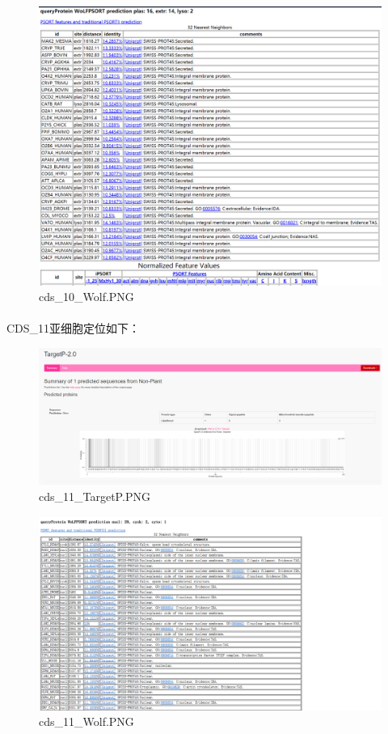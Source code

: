 \documentclass[supercite]{HustGraduPaper}
\begin{document}
	\begin{figure}[H]
		\centering
		\includegraphics[width=1\textwidth]{./material/practice2/cds_10/wolf.png}
		\caption{cds\_10\_Wolf.PNG}
	\end{figure}
	\paragraph{}\label{subpara:subpara}CDS\_11亚细胞定位如下：
	\begin{figure}[H]
		\centering
		\includegraphics[width=1\textwidth]{./material/practice2/cds_11/TargetP.png}
		\caption{cds\_11\_TargetP.PNG}
	\end{figure}
	\begin{figure}[H]
		\centering
		\includegraphics[width=1\textwidth]{./material/practice2/cds_11/wolf.png}
		\caption{cds\_11\_Wolf.PNG}
	\end{figure}
	\clearpage
\end{document}
